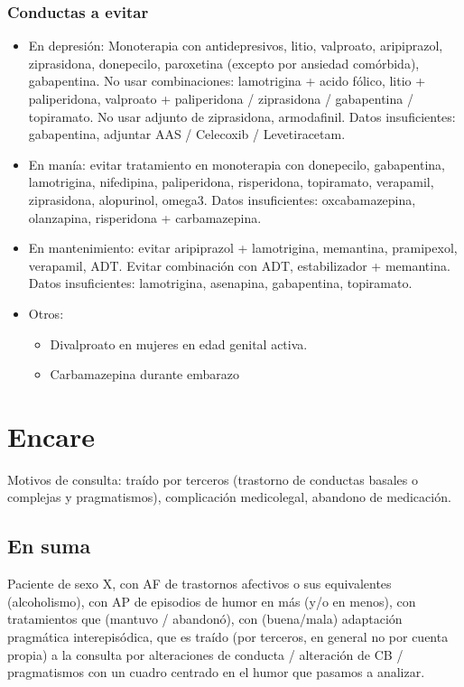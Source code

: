 \documentclass{scrbook}
\begin{document}
\subsubsection*{Conductas a evitar}
\begin{itemize}
	\item En depresión: Monoterapia con antidepresivos, litio, valproato, aripiprazol, ziprasidona, donepecilo, paroxetina (excepto por ansiedad comórbida), gabapentina. No usar combinaciones: lamotrigina + acido fólico, litio + paliperidona, valproato + paliperidona / ziprasidona / gabapentina / topiramato. No usar adjunto de ziprasidona, armodafinil. Datos insuficientes: gabapentina, adjuntar AAS / Celecoxib / Levetiracetam.
	\item En manía: evitar tratamiento en monoterapia con donepecilo, gabapentina, lamotrigina, nifedipina, paliperidona, risperidona, topiramato, verapamil, ziprasidona, alopurinol, omega3. Datos insuficientes: oxcabamazepina, olanzapina, risperidona + carbamazepina.
	\item En mantenimiento: evitar aripiprazol + lamotrigina, memantina, pramipexol, verapamil, ADT. Evitar combinación con ADT, estabilizador + memantina. Datos insuficientes: lamotrigina, asenapina, gabapentina, topiramato.
	\item Otros:
	\begin{itemize}
  		\item Divalproato en mujeres en edad genital activa.
		\item Carbamazepina durante embarazo
	\end{itemize}
\end{itemize}
\section*{Encare}
Motivos de consulta: traído por terceros (trastorno de conductas basales o complejas y pragmatismos), complicación medicolegal, abandono de medicación.
\subsection*{En suma}
Paciente de sexo X, con AF de trastornos afectivos o sus equivalentes (alcoholismo), con AP de episodios de humor en más (y/o en menos), con tratamientos que (mantuvo / abandonó), con (buena/mala) adaptación pragmática interepisódica, que es traído (por terceros, en general no por cuenta propia) a la consulta por alteraciones de conducta / alteración de CB / pragmatismos con un cuadro centrado en el humor que pasamos a analizar.
\end{document}
